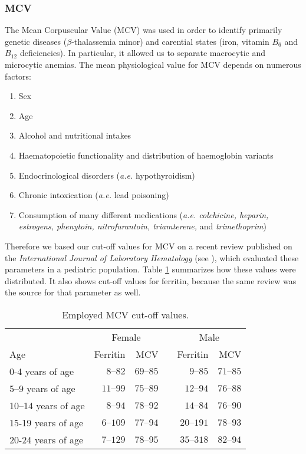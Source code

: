 \subsubsection{MCV}\label{sub:mcv}
The Mean Corpuscular Value (MCV) was used in order to identify primarily genetic diseases ($\beta$-thalassemia minor) and carential states (iron, vitamin $B_{6}$ and $B_{12}$ deficiencies). In particular, it allowed us to separate macrocytic and microcytic anemias. The mean physiological value for MCV depends on numerous factors:

\begin{enumerate}
	\item Sex
	\item Age
	\item Alcohol and nutritional intakes
	\item Haematopoietic functionality and distribution of haemoglobin variants
	\item Endocrinological disorders (\textit{a.e.} hypothyroidism)
	\item Chronic intoxication (\textit{a.e.} lead poisoning)
	\item Consumption of many different medications (\textit{a.e. colchicine, heparin, estrogens, phenytoin, nitrofurantoin, triamterene,} and \textit{trimethoprim})
\end{enumerate}

Therefore we based our cut-off values for MCV on a recent review published on the \textit{International Journal of Laboratory Hematology} (see \cite{MCVferritincutoff}), which evaluated these parameters in a pediatric population. Table \ref{tab:cutoffmcv} summarizes how these values were distributed. It also shows cut-off values for ferritin, because the same review was the source for that parameter as well.

\begin{table}[H]
   \centering
   \begin{tabular}{l r r c r r}
   	  & \multicolumn{2}{c}{Female} & & \multicolumn{2}{c}{Male}\\
   	 \cline{2-3} \cline{5-6}
      Age & Ferritin\footnotemark[3] & MCV\footnotemark[4] & & Ferritin\footnotemark[3] & MCV\footnotemark[4]\\
      \hline
      0-4 years of age & $8–82$ & $69–85$ & & $9–85$ & $71–85$\\
      5–9 years of age & $11–99$ & $75–89$ & & $12–94$ & $76–88$\\
      10–14 years of age & $8–94$ & $78–92$ & & $14–84$ & $76–90$\\
      15-19 years of age & $6–109$ & $77–94$ & & $20–191$ & $78–93$\\
      20-24 years of age & $7–129$ & $78–95$ & & $35–318$ & $82–94$\\
   \end{tabular}
   \caption{Employed MCV cut-off values.}
    \label{tab:cutoffmcv}
\end{table}

